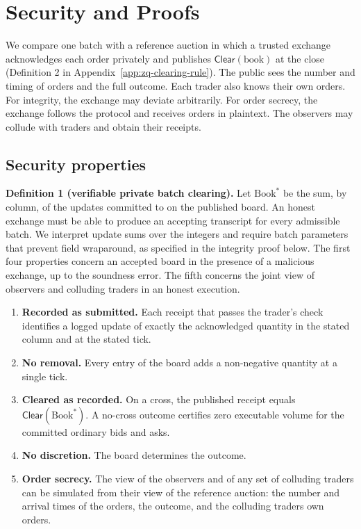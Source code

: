 
\section{Security and Proofs}
\label{app:zq-security}

We compare one batch with a reference auction in which a trusted exchange acknowledges each order privately and publishes \(\mathsf{Clear}(\mathrm{book})\) at the close (Definition 2 in Appendix~\ref{app:zq-clearing-rule}). The public sees the number and timing of orders and the full outcome. Each trader also knows their own orders. For integrity, the exchange may deviate arbitrarily. For order secrecy, the exchange follows the protocol and receives orders in plaintext. The observers may collude with traders and obtain their receipts.

\subsection{Security properties}

\textbf{Definition 1 (verifiable private batch clearing).} Let \(\mathrm{Book}^*\) be the sum, by column, of the updates committed to on the published board. An honest exchange must be able to produce an accepting transcript for every admissible batch. We interpret update sums over the integers and require batch parameters that prevent field wraparound, as specified in the integrity proof below. The first four properties concern an accepted board in the presence of a malicious exchange, up to the soundness error. The fifth concerns the joint view of observers and colluding traders in an honest execution.

\begin{enumerate}
\def\labelenumi{\arabic{enumi}.}
\item
  \textbf{Recorded as submitted.} Each receipt that passes the trader's check identifies a logged update of exactly the acknowledged quantity in the stated column and at the stated tick.
\item
  \textbf{No removal.} Every entry of the board adds a non-negative quantity at a single tick.
\item
  \textbf{Cleared as recorded.} On a cross, the published receipt equals \(\mathsf{Clear}(\text{Book}^*)\). A no-cross outcome certifies zero executable volume for the committed ordinary bids and asks.
\item
  \textbf{No discretion.} The board determines the outcome.
\item
  \textbf{Order secrecy.} The view of the observers and of any set of colluding traders can be simulated from their view of the reference auction: the number and arrival times of the orders, the outcome, and the colluding traders\textquotesingle{} own orders.
\end{enumerate}

